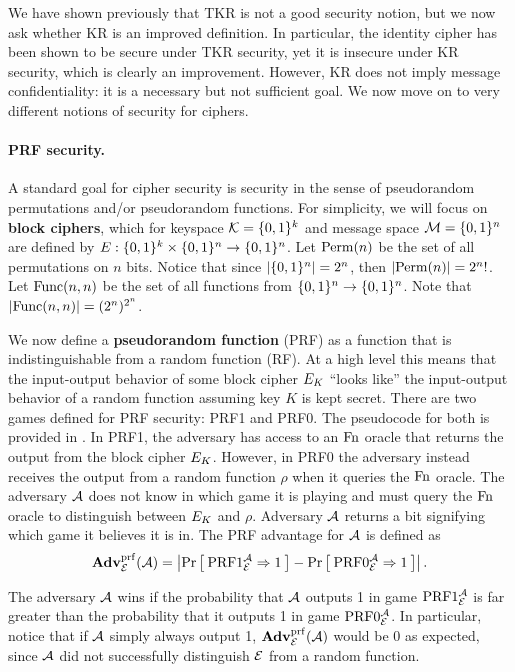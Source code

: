 We have shown previously that TKR is not a good security notion, but we now ask whether KR is an improved definition. In particular, the identity cipher has been shown to be secure under TKR security, yet it is insecure under KR security, which is clearly an improvement. However, KR does not imply message confidentiality: it is a necessary but not sufficient goal. We now move on to very different notions of security for ciphers.

\paragraph{PRF security.} A standard goal for cipher security is security in the sense of pseudorandom permutations and/or pseudorandom functions. For simplicity, we will focus on \textbf{block ciphers}, which for keyspace ${\cal K}=\{0,1\}^k$ and message space ${\cal M}=\{0,1\}^n$ are defined by $E : \{0,1\}^k \times \{0,1\}^n \to \{0,1\}^n$. Let $\mathrm{Perm}(n)$ be the set of all permutations on $n$ bits. Notice that since $|\{0,1\}^n| = 2^n$, then $|\mathrm{Perm}(n)| = 2^n!$. Let $\mathrm{Func}(n,n)$ be the set of all functions from $\{0,1\}^n \to \{0,1\}^n$. Note that $|\mathrm{Func}(n,n)| = (2^n)^{2^n}$.

We now define a \textbf{pseudorandom function} (PRF) as a function that is indistinguishable from a random function (RF). At a high level this means that the input-output behavior of some block cipher $E_K$ ``looks like'' the input-output behavior of a random function assuming key $K$ is kept secret. There are two games defined for PRF security: PRF1 and PRF0. The pseudocode for both is provided in . In PRF1, the adversary has access to an $\textnormal{Fn}$ oracle that returns the output from the block cipher $E_K$. However, in PRF0 the adversary instead receives the output from a random function $\rho$ when it queries the $\textnormal{Fn}$ oracle. The adversary ${\mathcal A}$ does not know in which game it is playing and must query the $\textnormal{Fn}$ oracle to distinguish between $E_K$ and $\rho$. Adversary ${\mathcal A}$ returns a bit signifying which game it believes it is in. The PRF advantage for ${\mathcal A}$ is defined as 
\begin{equation*}
\mathbf{Adv}^{\mathrm{prf}}_{{\cal E}}({\mathcal A}) = \left| \Pr\left[\: \textnormal{PRF}1_{\cal E}^{\mathcal A}\Rightarrow 1 \:\right] 
- \Pr\left[\: \textnormal{PRF}0_{\cal E}^{\mathcal A}\Rightarrow1 \:\right] \right|.
\end{equation*}

The adversary ${\mathcal A}$ wins if the probability that ${\mathcal A}$ outputs 1 in game $\textnormal{PRF}1_{\cal E}^{\mathcal A}$ is far greater than the probability that it outputs 1 in game $\textnormal{PRF}0_{\cal E}^{\mathcal A}$. In particular, notice that if ${\mathcal A}$ simply always output 1, $\mathbf{Adv}^{\mathrm{prf}}_{{\cal E}}({\mathcal A})$ would be 0 as expected, since ${\mathcal A}$ did not successfully distinguish ${\cal E}$ from a random function. 

